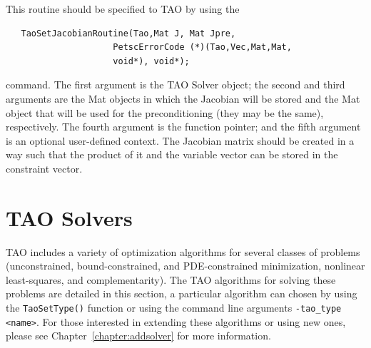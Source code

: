 \documentclass[]{book}
\begin{document}
This routine should be specified to TAO by using the
\begin{verbatim}
   TaoSetJacobianRoutine(Tao,Mat J, Mat Jpre,
                     PetscErrorCode (*)(Tao,Vec,Mat,Mat, 
                     void*), void*);
\end{verbatim}
\noindent
command.
The first argument is the TAO Solver object; the second
and third arguments are the Mat objects in which the Jacobian will be stored
and the Mat object that will be used for the preconditioning (they may
be the same), respectively. 
The fourth argument is the function pointer; and the fifth argument is
an optional user-defined context.
The Jacobian matrix should be created in a way such that the product of 
it and the variable vector can be stored in the constraint vector.


\chapter{TAO Solvers}
TAO includes a variety of optimization algorithms for several
classes of problems (unconstrained, bound-constrained,
and PDE-constrained minimization, nonlinear least-squares, and complementarity).
The TAO algorithms for solving these problems are detailed in this section, 
a particular algorithm can chosen by using the \texttt{TaoSetType()} function
or using the command line arguments \texttt{-tao\_type <name>}.
For those interested in extending these algorithms or using new ones, 
please see Chapter~\ref{chapter:addsolver} for more information.
\end{document}
